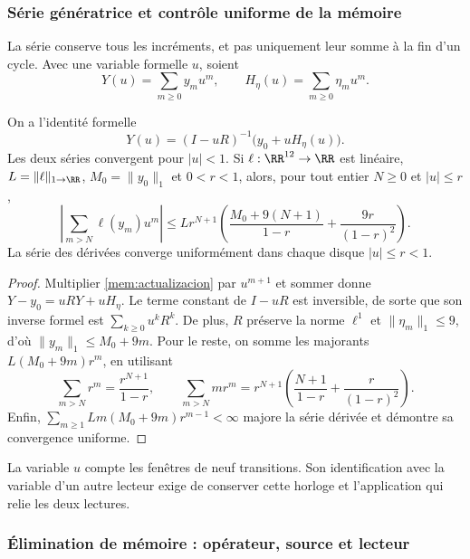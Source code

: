 \subsubsection{Série génératrice et contrôle uniforme de la mémoire}

La série conserve tous les incréments, et pas uniquement leur somme à la fin
d'un cycle. Avec une variable formelle \(u\), soient
\[
 Y(u)=\sum_{m\geq0}y_mu^m,\qquad
 H_\eta(u)=\sum_{m\geq0}\eta_mu^m.
\]

\begin{proposition}
\label{mem:prop-serie}
On a l'identité formelle
\begin{equation}
 Y(u)=(I-uR)^{-1}\bigl(y_0+uH_\eta(u)\bigr).
 \label{mem:serie}
\end{equation}
Les deux séries convergent pour \(|u|<1\). Si \(\ell:\RR^{12}\to\RR\)
est linéaire, \(L=\|\ell\|_{1\to\RR}\), \(M_0=\|y_0\|_1\) et
\(0<r<1\), alors, pour tout entier \(N\geq0\) et \(|u|\leq r\),
\begin{equation}
 \left|\sum_{m>N}\ell(y_m)u^m\right|
 \leq Lr^{N+1}\left(
 \frac{M_0+9(N+1)}{1-r}+\frac{9r}{(1-r)^2}\right).
 \label{mem:cota}
\end{equation}
La série des dérivées converge uniformément dans chaque disque
\(|u|\leq r<1\).
\end{proposition}
\begin{proof}
Multiplier \eqref{mem:actualizacion} par \(u^{m+1}\) et sommer donne
\(Y-y_0=uRY+uH_\eta\). Le terme constant de \(I-uR\) est
inversible, de sorte que son inverse formel est \(\sum_{k\geq0}u^kR^k\).
De plus, \(R\) préserve la norme \(\ell^1\) et
\(\|\eta_m\|_1\leq9\), d'où
\(\|y_m\|_1\leq M_0+9m\).
Pour le reste, on somme les majorants
\(L(M_0+9m)r^m\), en utilisant
\[
 \sum_{m>N}r^m=\frac{r^{N+1}}{1-r},\qquad
 \sum_{m>N}mr^m=r^{N+1}
 \left(\frac{N+1}{1-r}+\frac r{(1-r)^2}\right).
\]
Enfin, \(\sum_{m\geq1}Lm(M_0+9m)r^{m-1}<\infty\)
majore la série dérivée et démontre sa convergence uniforme.
\end{proof}

La variable \(u\) compte les fenêtres de neuf transitions. Son identification
avec la variable d'un autre lecteur exige de conserver cette horloge et l'application
qui relie les deux lectures.

\subsubsection{Élimination de mémoire : opérateur, source et lecteur}

